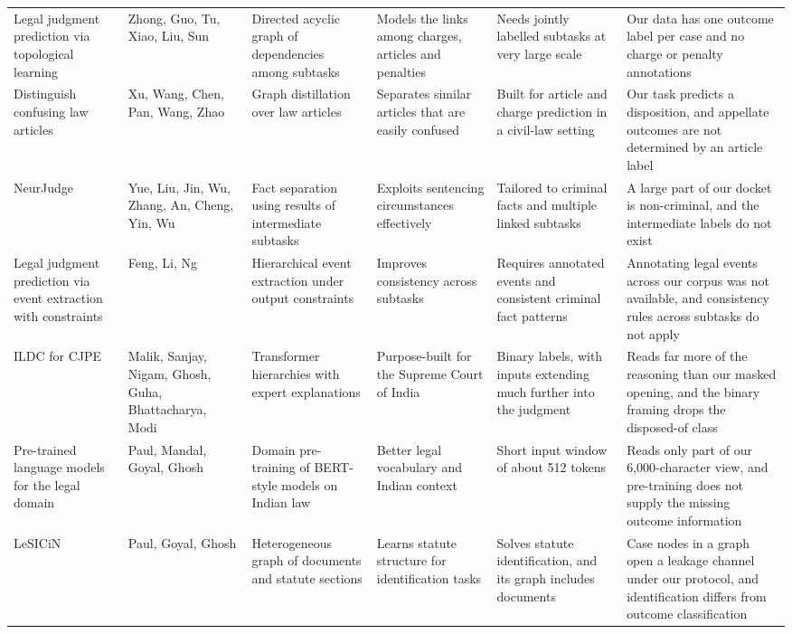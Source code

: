 \documentclass[11pt,a4paper]{article}
\begin{document}
\begin{landscape}
\begin{longtable}{@{}Y{3.2cm}Y{2.5cm}Y{4.3cm}Y{4cm}Y{4cm}Y{5.2cm}@{}}
Legal judgment prediction via topological learning \cite{r5} & Zhong, Guo, Tu, Xiao, Liu, Sun & Directed acyclic graph of dependencies among subtasks & Models the links among charges, articles and penalties & Needs jointly labelled subtasks at very large scale & Our data has one outcome label per case and no charge or penalty annotations\\
Distinguish confusing law articles \cite{r15} & Xu, Wang, Chen, Pan, Wang, Zhao & Graph distillation over law articles & Separates similar articles that are easily confused & Built for article and charge prediction in a civil-law setting & Our task predicts a disposition, and appellate outcomes are not determined by an article label\\
NeurJudge \cite{r36} & Yue, Liu, Jin, Wu, Zhang, An, Cheng, Yin, Wu & Fact separation using results of intermediate subtasks & Exploits sentencing circumstances effectively & Tailored to criminal facts and multiple linked subtasks & A large part of our docket is non-criminal, and the intermediate labels do not exist\\
Legal judgment prediction via event extraction with constraints \cite{r37} & Feng, Li, Ng & Hierarchical event extraction under output constraints & Improves consistency across subtasks & Requires annotated events and consistent criminal fact patterns & Annotating legal events across our corpus was not available, and consistency rules across subtasks do not apply\\
ILDC for CJPE \cite{r10} & Malik, Sanjay, Nigam, Ghosh, Guha, Bhattacharya, Modi & Transformer hierarchies with expert explanations & Purpose-built for the Supreme Court of India & Binary labels, with inputs extending much further into the judgment & Reads far more of the reasoning than our masked opening, and the binary framing drops the disposed-of class\\
Pre-trained language models for the legal domain \cite{r12} & Paul, Mandal, Goyal, Ghosh & Domain pre-training of BERT-style models on Indian law & Better legal vocabulary and Indian context & Short input window of about 512 tokens & Reads only part of our 6,000-character view, and pre-training does not supply the missing outcome information\\
LeSICiN \cite{r16} & Paul, Goyal, Ghosh & Heterogeneous graph of documents and statute sections & Learns statute structure for identification tasks & Solves statute identification, and its graph includes documents & Case nodes in a graph open a leakage channel under our protocol, and identification differs from outcome classification\\

\end{longtable}
\end{landscape}
\end{document}

